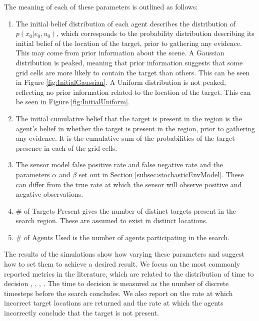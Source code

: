 The meaning of each of these parameters is outlined as follows:
\begin{enumerate}
    \item The initial belief distribution of each agent describes the distribution of $p(x_0 | e_0, u_0)$, which corresponds to the probability distribution describing its initial belief of the location of the target, prior to gathering any evidence. This may come from prior information about the scene. A Gaussian distribution is peaked, meaning that prior information suggests that some grid cells are more likely to contain the target than others. This can be seen in Figure \ref{fig:InitialGaussian}. A Uniform distribution is not peaked, reflecting no prior information related to the location of the target. This can be seen in Figure \ref{fig:InitialUniform}.
    \item The initial cumulative belief that the target is present in the region is the agent's belief in whether the target is present in the region, prior to gathering any evidence. It is the cumulative sum of the probabilities of the target presence in each of the grid cells.
    \item The sensor model false positive rate and false negative rate and the parameters $\alpha$ and $\beta$ set out in Section \ref{subsec:stochasticEnvModel}. These can differ from the true rate at which the sensor will observe positive and negative observations.
    \item \# of Targets Present gives the number of distinct targets present in the search region. These are assumed to exist in distinct locations.
    \item \# of Agents Used is the number of agents participating in the search.
\end{enumerate}
The results of the simulations show how varying these parameters and suggest how to set them to achieve a desired result. We focus on the most commonly reported metrics in the literature, which are related to the distribution of time to decision \cite{Chung2012AnalysisStrategies}, \cite{Waharte2010ProbabilisticUAVs}, \cite{Waharte2010SupportingUAVs}, \cite{Lau2007OptimalEnvironments}. The time to decision is measured as the number of discrete timesteps before the search concludes. We also report on the rate at which incorrect target locations are returned and the rate at which the agents incorrectly conclude that the target is not present. 

